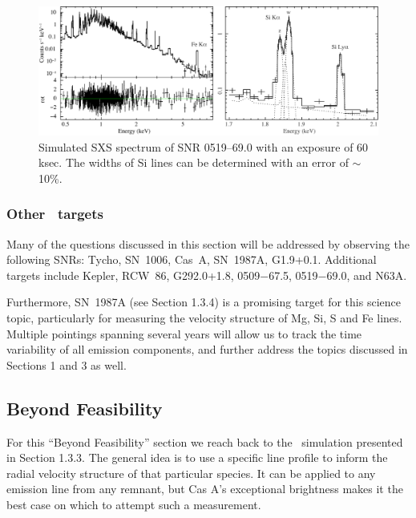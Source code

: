 \documentclass[11pt,a4paper]{article}
\begin{document}
{\begin{figure}
  \begin{center}
     \includegraphics[scale=0.3]{0519_sxs}
  \caption{Simulated SXS spectrum of SNR 0519--69.0 with an exposure of 60\,ksec. 
  The widths of Si lines can be determined with an error of $\sim$10\%.}
  \label{0519:sxs}
  \end{center}
\end{figure}


\subsubsection{Other \ah\ targets}

Many of the questions discussed in this section will be addressed by observing 
the following SNRs: Tycho, SN~1006, Cas~A, SN~1987A, 
G1.9+0.1. Additional targets include Kepler, RCW~86,
G292.0+1.8, 0509$-$67.5, 0519$-$69.0, and N63A.

Furthermore, SN~1987A (see Section 1.3.4) is a promising target for
this science topic, particularly for measuring the velocity structure of
Mg, Si, S and Fe lines.  Multiple pointings spanning several years will allow us to
track the time variability of all emission components, and further address the topics
discussed in Sections 1 and 3 as well.

\subsection{Beyond Feasibility}


For this ``Beyond Feasibility'' section we reach back to the
\casa\ simulation presented in Section 1.3.3.  The general idea is to
use a specific line profile to inform the radial velocity structure of
that particular species.  It can be applied to any emission line from
any remnant, but Cas A's exceptional brightness makes it the best case
on which to attempt such a measurement.

}
\end{document}
